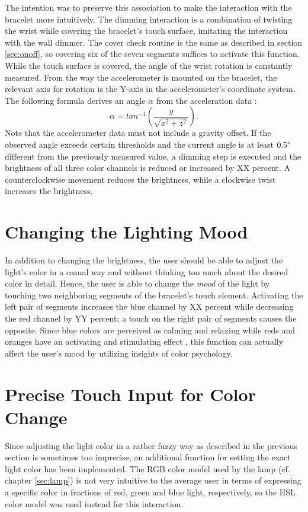 The intention was to preserve this association to make the interaction with the bracelet more intuitively. The dimming interaction is a combination of twisting the wrist while covering the bracelet's touch surface, imitating the interaction with the wall dimmer. The cover check routine is the same as described in section \ref{sec:onoff}, so covering six of the seven segments suffices to activate this function. While the touch surface is covered, the angle of the wrist rotation is constantly measured. From the way the accelerometer is mounted on the bracelet, the relevant axis for rotation is the Y-axis in the accelerometer's coordinate system. The following formula derives an angle $\alpha$ from the acceleration data \cite{Abayarjoo2013}:
\[ %
\alpha = tan^{-1}(\frac{y}{\sqrt{x^2 + z^2}}).
\]
Note that the accelerometer data must not include a gravity offset. If the observed angle exceeds certain thresholds and the current angle is at least $0.5\degree$ different from the previously measured value, a dimming step is executed and the brightness of all three color channels is reduced or increased by XX percent. A counterclockwise movement reduces the brightness, while a clockwise twist increases the brightness.

\section{Changing the Lighting Mood}
In addition to changing the brightness, the user should be able to adjust the light's color in a casual way and without thinking too much about the desired color in detail. Hence, the user is able to change the \textit{mood} of the light by touching two neighboring segments of the bracelet's touch element. Activating the left pair of segments increases the blue channel by XX percent while decreasing the red channel by YY percent; a touch on the right pair of segments causes the opposite. Since blue colors are perceived as calming and relaxing while reds and oranges have an activating and stimulating effect \cite{Rosenstein1985}, this function can actually affect the user's mood by utilizing insights of color psychology.

\section{Precise Touch Input for Color Change}
Since adjusting the light color in a rather fuzzy way as described in the previous section is sometimes too imprecise, an additional function for setting the exact light color has been implemented. The RGB color model used by the lamp (cf. chapter \ref{sec:lamp}) is not very intuitive to the average user in terms of expressing a specific color in fractions of red, green and blue light, respectively, so the \ac{HSL} color model was used instead for this interaction.

